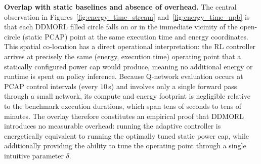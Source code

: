 \noindent\textbf{Overlap with static baselines and absence of overhead.}
The central observation in Figures~\ref{fig:energy_time_stream} and~\ref{fig:energy_time_npb} is that each DDMORL filled circle falls on or in the immediate vicinity of the open-circle (static PCAP) point at the same execution time and energy coordinates. This spatial co-location has a direct operational interpretation: the RL controller arrives at precisely the same (energy, execution time) operating point that a statically configured power cap would produce, meaning no additional energy or runtime is spent on policy inference. Because Q-network evaluation occurs at PCAP control intervals (every $10$\,s) and involves only a single forward pass through a small network, its compute and energy footprint is negligible relative to the benchmark execution durations, which span tens of seconds to tens of minutes. The overlay therefore constitutes an empirical proof that DDMORL introduces no measurable overhead: running the adaptive controller is energetically equivalent to running the optimally tuned static power cap, while additionally providing the ability to tune the operating point through a single intuitive parameter $\delta$.

